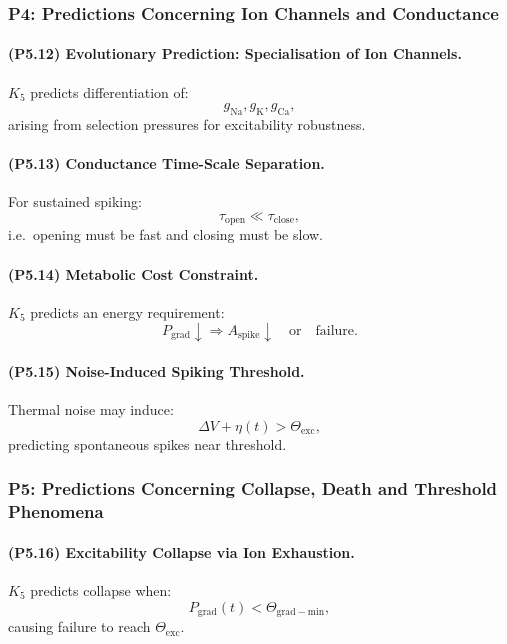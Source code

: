 \subsubsection{P4: Predictions Concerning Ion Channels and Conductance}

\paragraph{(P5.12) Evolutionary Prediction: Specialisation of Ion Channels.}
$K_5$ predicts differentiation of:
\[
g_{\mathrm{Na}}, g_{\mathrm{K}}, g_{\mathrm{Ca}},
\]
arising from selection pressures for excitability robustness.

\paragraph{(P5.13) Conductance Time-Scale Separation.}
For sustained spiking:
\[
\tau_{\mathrm{open}} \ll \tau_{\mathrm{close}},
\]
i.e.\ opening must be fast and closing must be slow.

\paragraph{(P5.14) Metabolic Cost Constraint.}
$K_5$ predicts an energy requirement:
\[
P_{\mathrm{grad}} \downarrow \Rightarrow
A_{\mathrm{spike}} \downarrow \quad \text{or} \quad \text{failure}.
\]

\paragraph{(P5.15) Noise-Induced Spiking Threshold.}
Thermal noise may induce:
\[
\Delta V + \eta(t) > \Theta_{\mathrm{exc}},
\]
predicting spontaneous spikes near threshold.

\subsubsection{P5: Predictions Concerning Collapse, Death and Threshold Phenomena}

\paragraph{(P5.16) Excitability Collapse via Ion Exhaustion.}
$K_5$ predicts collapse when:
\[
P_{\mathrm{grad}}(t) < \Theta_{\mathrm{grad-min}},
\]
causing failure to reach $\Theta_{\mathrm{exc}}$.

